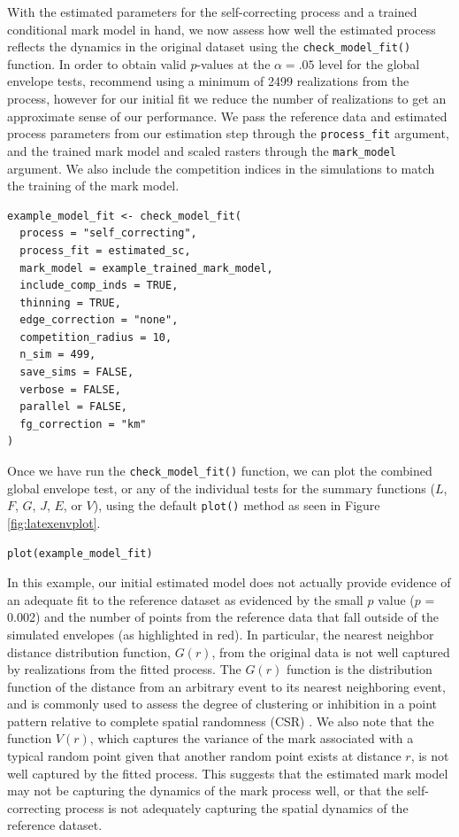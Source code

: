 With the estimated parameters for the self-correcting process and a
{trained conditional mark model in hand, we now assess how well the estimated process reflects the dynamics in
the original dataset using the \texttt{check\_model\_fit()} function. In order
to obtain valid \(p\)-values at the \(\alpha = .05\) level for the global
envelope tests, \citet{myllymakiGlobalEnvelopeTests2017} recommend using a
minimum of 2499 realizations from the process, however for our initial fit we reduce the number of realizations to get an approximate sense of our performance. We pass the reference data and estimated process parameters from our estimation step through the \texttt{process\_fit} argument, and the trained mark model and scaled rasters through the \texttt{mark\_model} argument. We also include the competition indices in the simulations to match the training of the mark model.}

\begin{verbatim}
example_model_fit <- check_model_fit(
  process = "self_correcting",
  process_fit = estimated_sc,
  mark_model = example_trained_mark_model,
  include_comp_inds = TRUE,
  thinning = TRUE,
  edge_correction = "none",
  competition_radius = 10,
  n_sim = 499,
  save_sims = FALSE,
  verbose = FALSE,
  parallel = FALSE,
  fg_correction = "km"
)
\end{verbatim}

Once we have run the \texttt{check\_model\_fit()} function, we can plot the
combined global envelope test, or any of the individual tests for the
summary functions (\(L\), \(F\), \(G\), \(J\), \(E\), or \(V\)), using the default \texttt{plot()} method as seen in Figure
\ref{fig:latexenvplot}.

\begin{verbatim}
plot(example_model_fit)
\end{verbatim}

In this example, our initial estimated model does not actually provide evidence of an
adequate fit to the reference dataset as evidenced by the small \(p\)
value (\(p\) = 0.002) and the number of points from the reference data that fall outside
of the simulated envelopes (as highlighted in red). {In particular, the
nearest neighbor distance distribution function, \(G(r)\), from the original data is not
well captured by realizations from the fitted process. The \(G(r)\)
function is the distribution function of the distance from an arbitrary event to its nearest neighboring event, and is commonly used to assess the degree of clustering or inhibition in a point pattern relative to complete spatial randomness (CSR)
\citep{ripleyStatisticalInferenceSpatial1988}}. We also note that the function
\(V(r)\), which captures the variance of the mark associated with a
typical random point given that another random point exists at distance
\(r\), is not well captured by the fitted process. This suggests that the
estimated mark model may not be capturing the dynamics of the mark
process well, or that the self-correcting process is not adequately
capturing the spatial dynamics of the reference dataset.

